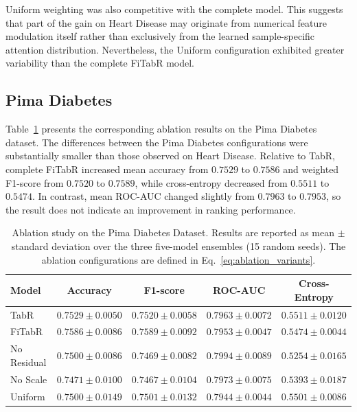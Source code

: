 \documentclass[11pt,a4paper,oneside, openany, reqno, chapter, nokorean]{oblivoir}
\theoremstyle{definition}
\theoremstyle{remark}
\numberwithin{equation}{chapter}
\theoremstyle{definition}
\theoremstyle{remark}
\theoremstyle{definition}
\begin{document}
Uniform weighting was also competitive with the complete model. This
suggests that part of the gain on Heart Disease may originate from
numerical feature modulation itself rather than exclusively from the
learned sample-specific attention distribution. Nevertheless, the
Uniform configuration exhibited greater variability than the complete
FiTabR model.

\subsection{Pima Diabetes}
\label{subsec:pima_ablation}

Table~\ref{tab:pima_ablation} presents the corresponding ablation
results on the Pima Diabetes dataset. The differences between the 
Pima Diabetes configurations were substantially
smaller than those observed on Heart Disease. Relative to
TabR, complete FiTabR increased mean accuracy from $0.7529$ to $0.7586$
and weighted F1-score from $0.7520$ to $0.7589$, while cross-entropy
decreased from $0.5511$ to $0.5474$. In contrast, mean ROC-AUC changed
slightly from $0.7963$ to $0.7953$, so the result does not indicate an
improvement in ranking performance.

\begin{table}[!htbp]
\centering
\caption[Ablation study on the Pima Diabetes Dataset.]{Ablation study on the Pima Diabetes Dataset. Results are
reported as mean $\pm$ standard deviation over the three five-model ensembles (15 random seeds). The ablation configurations are defined in Eq.~\eqref{eq:ablation_variants}.}
\label{tab:pima_ablation}
\small
\begin{tabular}{lcccc}
\toprule
Model & Accuracy & F1-score & ROC-AUC & Cross-Entropy \\
\midrule
TabR        & $0.7529 \pm 0.0050$ & $0.7520 \pm 0.0058$ & $0.7963 \pm 0.0072$ & $0.5511 \pm 0.0120$ \\
FiTabR      & $0.7586 \pm 0.0086$ & $0.7589 \pm 0.0092$ & $0.7953 \pm 0.0047$ & $0.5474 \pm 0.0044$ \\
No Residual & $0.7500 \pm 0.0086$ & $0.7469 \pm 0.0082$ & $0.7994 \pm 0.0089$ & $0.5254 \pm 0.0165$ \\
No Scale    & $0.7471 \pm 0.0100$ & $0.7467 \pm 0.0104$ & $0.7973 \pm 0.0075$ & $0.5393 \pm 0.0187$ \\
Uniform     & $0.7500 \pm 0.0149$ & $0.7501 \pm 0.0132$ & $0.7944 \pm 0.0044$ & $0.5501 \pm 0.0086$ \\
\bottomrule
\end{tabular}
\end{table}
\end{document}
